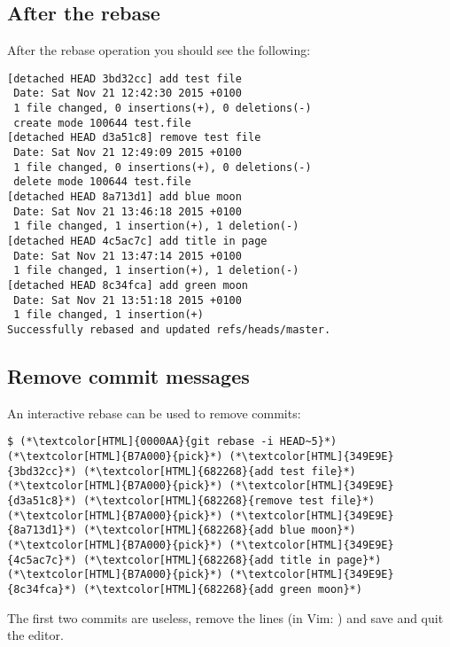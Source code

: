 \subsection{After the rebase}
\begin{frame}[fragile]
  \subslidetitle

   After the rebase operation you should see the following:
  \begin{lstlisting}
[detached HEAD 3bd32cc] add test file
 Date: Sat Nov 21 12:42:30 2015 +0100
 1 file changed, 0 insertions(+), 0 deletions(-)
 create mode 100644 test.file
[detached HEAD d3a51c8] remove test file
 Date: Sat Nov 21 12:49:09 2015 +0100
 1 file changed, 0 insertions(+), 0 deletions(-)
 delete mode 100644 test.file
[detached HEAD 8a713d1] add blue moon
 Date: Sat Nov 21 13:46:18 2015 +0100
 1 file changed, 1 insertion(+), 1 deletion(-)
[detached HEAD 4c5ac7c] add title in page
 Date: Sat Nov 21 13:47:14 2015 +0100
 1 file changed, 1 insertion(+), 1 deletion(-)
[detached HEAD 8c34fca] add green moon
 Date: Sat Nov 21 13:51:18 2015 +0100
 1 file changed, 1 insertion(+)
Successfully rebased and updated refs/heads/master.
\end{lstlisting}
\end{frame}

\subsection{Remove commit messages}
\begin{frame}[fragile]
  \subslidetitle
  An interactive rebase can be used to remove commits:
  \begin{lstlisting}
$ (*\textcolor[HTML]{0000AA}{git rebase -i HEAD~5}*)
(*\textcolor[HTML]{B7A000}{pick}*) (*\textcolor[HTML]{349E9E}{3bd32cc}*) (*\textcolor[HTML]{682268}{add test file}*)
(*\textcolor[HTML]{B7A000}{pick}*) (*\textcolor[HTML]{349E9E}{d3a51c8}*) (*\textcolor[HTML]{682268}{remove test file}*)
(*\textcolor[HTML]{B7A000}{pick}*) (*\textcolor[HTML]{349E9E}{8a713d1}*) (*\textcolor[HTML]{682268}{add blue moon}*)
(*\textcolor[HTML]{B7A000}{pick}*) (*\textcolor[HTML]{349E9E}{4c5ac7c}*) (*\textcolor[HTML]{682268}{add title in page}*)
(*\textcolor[HTML]{B7A000}{pick}*) (*\textcolor[HTML]{349E9E}{8c34fca}*) (*\textcolor[HTML]{682268}{add green moon}*)
\end{lstlisting}
  The first two commits are useless, remove the lines (in Vim: ) and save and quit the editor.

\end{frame}

